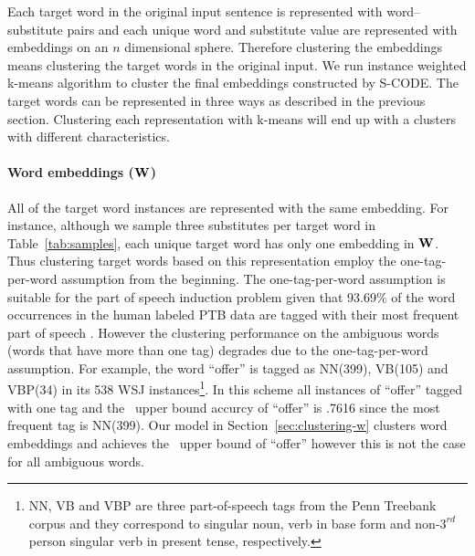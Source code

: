 Each target word in the original input sentence is represented with
word--substitute pairs and each unique word and substitute value are
represented with embeddings on an $n$ dimensional sphere.  Therefore
clustering the embeddings means clustering the target words in the
original input.  We run instance weighted k-means algorithm to cluster
the final embeddings constructed by S-CODE.  The target words can be
represented in three ways as described in the previous section.
Clustering each representation with k-means will end up with a
clusters with different characteristics.

\paragraph{Word embeddings (${\bf W}$)} All of the target word
instances are represented with the same embedding.  For instance,
although we sample three substitutes per target word in
Table~\ref{tab:samples}, each unique target word has only one
embedding in ${\bf W}$.  Thus clustering target words based on this
representation employ the one-tag-per-word assumption from the
beginning.  The one-tag-per-word assumption is suitable for the part
of speech induction problem given that 93.69\% of the word occurrences
in the human labeled PTB data are tagged with their most frequent part
of speech \cite{Toutanova:2003:FPT:1073445.1073478}.  However the
clustering performance on the ambiguous words (words that have more
than one tag) degrades due to the one-tag-per-word assumption.  For
example, the word ``offer'' is tagged as NN(399), VB(105) and VBP(34)
in its 538 WSJ instances\footnote{NN, VB and VBP are three
  part-of-speech tags from the Penn Treebank corpus and they
  correspond to singular noun, verb in base form and
  non-$3^{rd}$person singular verb in present tense, respectively.}.
In this scheme all instances of ``offer'' tagged with one tag and the
\mto\ upper bound accurcy of ``offer'' is .7616 since the most
frequent tag is NN(399). Our model in Section~\ref{sec:clustering-w}
clusters word embeddings and achieves the \mto\ upper bound of
``offer'' however this is not the case for all ambiguous words.

